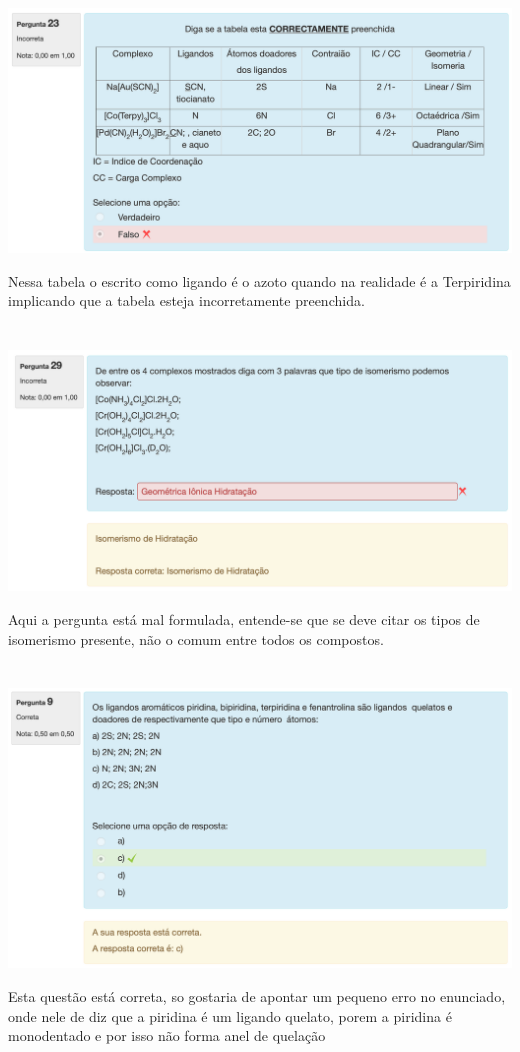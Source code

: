 \documentclass[12pt]{article}
\begin{document}
\setcounter{section}{22}
\section{}

\includegraphics[width=\textwidth]{img2}

Nessa tabela o escrito como ligando é o azoto quando na realidade é a Terpiridina implicando que a tabela esteja incorretamente preenchida.

\setcounter{section}{28}
\section{}

\includegraphics[width=\textwidth]{img1}

Aqui a pergunta está mal formulada, entende-se que se deve citar os tipos de isomerismo presente, não o comum entre todos os compostos.

\setcounter{section}{8}

\section{}
\includegraphics[width=\textwidth]{img3}

Esta questão está correta, so gostaria de apontar um pequeno erro no enunciado, onde nele de diz que a piridina é um ligando quelato, porem a piridina é monodentado e por isso não forma anel de quelação
\end{document}
